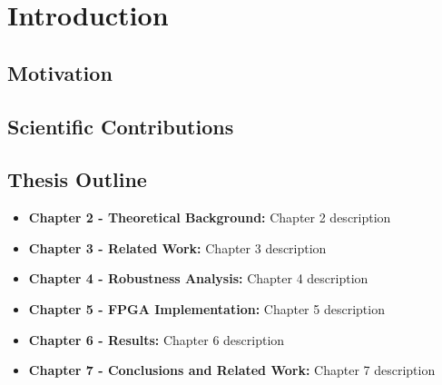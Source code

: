\chapter{Introduction}
\label{Chapter-Introduction}

\section{Motivation}
\section{Scientific Contributions}
\section{Thesis Outline}
\begin{itemize}
	\item \textbf{Chapter 2 - Theoretical Background:} Chapter 2 description
	\item \textbf{Chapter 3 - Related Work:} Chapter 3 description
	\item \textbf{Chapter 4 - Robustness Analysis:} Chapter 4 description
	\item \textbf{Chapter 5 - FPGA Implementation:} Chapter 5 description
	\item \textbf{Chapter 6 - Results:} Chapter 6 description
	\item \textbf{Chapter 7 - Conclusions and Related Work:} Chapter 7 description
\end{itemize}
